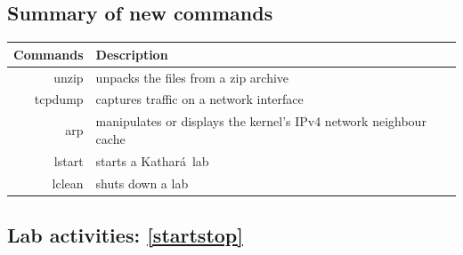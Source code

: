 \documentclass[12pt]{book}
\newcommand{\kathara}{Kathar\'a}
\begin{document}
\subsection{Summary of new commands}

\begin{tabularx}{\textwidth}{r  X}
  Commands & Description \\ \midrule
  unzip & unpacks the files from a zip archive \\
  tcpdump & captures traffic on a network interface \\
  arp & manipulates  or displays the kernel's IPv4 network neighbour cache \\ \midrule
  lstart & starts a \kathara\ lab \\
  lclean & shuts down a lab
\end{tabularx}


\subsection{Lab activities: \ref{startstop}}\label{2nodes.se}
\end{document}
